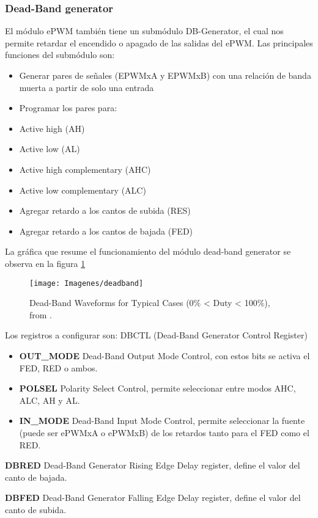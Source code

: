 \subsubsection{Dead-Band generator}
El módulo ePWM también tiene un submódulo DB-Generator, el cual nos permite retardar el encendido o apagado de las salidas del ePWM. Las principales funciones del submódulo son:
\begin{itemize}
	\setlength{\itemindent}{-.0in}
	\item Generar pares de señales (EPWMxA y EPWMxB) con una relación de banda muerta a partir de solo una entrada
	\item Programar los pares para:
	\setlength{\itemindent}{+.5in}
	\item Active high (AH)
	\item Active low (AL)	
	\item Active high complementary (AHC)
	\item Active low complementary (ALC)
	\setlength{\itemindent}{-.0in}
	\item Agregar retardo a los cantos de subida (RES)
	\item Agregar retardo a los cantos de bajada (FED)
\end{itemize}

La gráfica que resume el funcionamiento del módulo dead-band generator se observa en la figura \ref{fig:11}

\begin{figure}[H]
	\centering
	\texttt{[image: Imagenes/deadband]}
	\caption{Dead-Band Waveforms for Typical Cases (0\% < Duty < 100\%), from \cite[page 1906]{tmr}.}
	\label{fig:11}
\end{figure}

Los registros a configurar son:
DBCTL (Dead-Band Generator Control Register)
\begin{itemize}
	\item \textbf{OUT\_MODE} Dead-Band Output Mode Control, con estos bits se activa el FED, RED o ambos.
	\item \textbf{POLSEL} Polarity Select Control, permite seleccionar entre modos AHC, ALC, AH y AL.
	\item \textbf{IN\_MODE} Dead-Band Input Mode Control, permite seleccionar la fuente (puede ser ePWMxA o ePWMxB) de los retardos tanto para el FED como el RED.
\end{itemize}

\textbf{DBRED} Dead-Band Generator Rising Edge Delay register, define el valor del canto de bajada.\par
\textbf{DBFED} Dead-Band Generator Falling Edge Delay register, define el valor del canto de subida.\\
